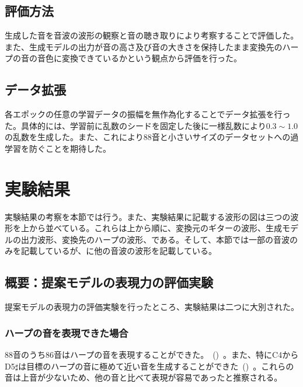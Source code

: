 \clearpage

\subsection{評価方法}

生成した音を音波の波形の観察と音の聴き取りにより考察することで評価した。また、生成モデルの出力が音の高さ及び音の大きさを保持したまま変換先のハープの音の音色に変換できているかという観点から評価を行った。

\subsection{データ拡張}

各エポックの任意の学習データの振幅を無作為化することでデータ拡張を行った。具体的には、学習前に乱数のシードを固定した後に一様乱数により$0.3\sim1.0$の乱数を生成した。また、これにより88音と小さいサイズのデータセットへの過学習を防ぐことを期待した。

\section{実験結果}
\label{sec:result}

実験結果の考察を本節では行う。また、実験結果に記載する波形の図は三つの波形を上から並べている。これらは上から順に、変換元のギターの波形、生成モデルの出力波形、変換先のハープの波形、である。そして、本節では一部の音波のみを記載しているが、に他の音波の波形を記載している。

\subsection{概要：提案モデルの表現力の評価実験}

提案モデルの表現力の評価実験を行ったところ、実験結果は二つに大別された。

\subsubsection{ハープの音を表現できた場合}

88音のうち86音はハープの音を表現することができた。~()~。また、特にC4からD5$\sharp$は目標のハープの音に極めて近い音を生成することができた~()~。これらの音は上音が少ないため、他の音と比べて表現が容易であったと推察される。

